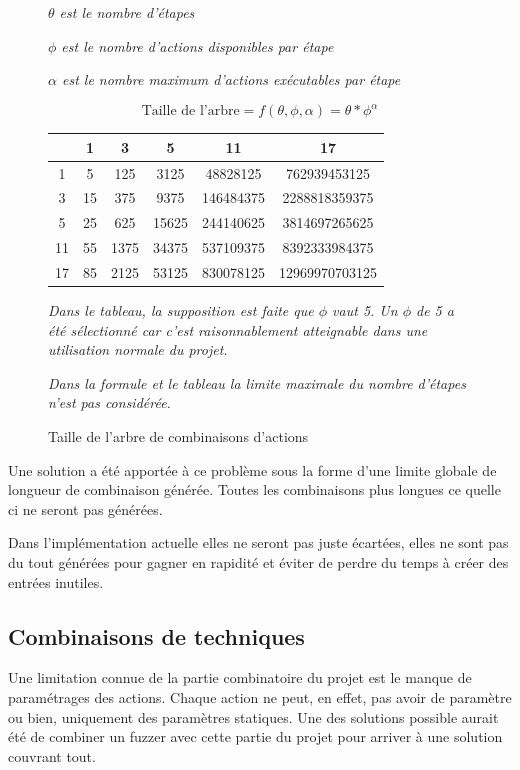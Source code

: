 \documentclass[a4paper]{report}
\begin{document}
\begin{figure}[ht]
	\textit{$ \theta $ est le nombre d'étapes}
	
	\textit{$\phi$ est le nombre d'actions disponibles par étape}
	
	\textit{$\alpha$ est le nombre maximum d'actions exécutables par étape}
	
	$$ \text{Taille de l'arbre} = f(\theta, \phi, \alpha ) = \theta*\phi^{\alpha} $$
	
	\begin{center}
	\begin{tabular}{c||c|c|c|c|c}
	\hbox{\diagbox{$ \theta $}{$\alpha$}}
	 & 1 & 3 & 5 & 11 & 17\\ 
	\hline 
	\hline 
	1 & 5 & 125 & 3125 & 48828125 & 762939453125 \\
	\hline 
	3 & 15 & 375 & 9375 & 146484375 & 2288818359375 \\
	\hline 
	5 & 25 & 625 & 15625 & 244140625 & 3814697265625 \\
	\hline 
	11 & 55 & 1375 & 34375 & 537109375 & 8392333984375 \\
	\hline 
	17 & 85 & 2125 & 53125 & 830078125 & 12969970703125
	\end{tabular}
	\end{center}
	
	\textit{Dans le tableau, la supposition est faite que $ \phi $ vaut 5.
	Un $ \phi $ de 5 a été sélectionné car c'est raisonnablement atteignable dans une utilisation normale du projet.}
	
	\textit{Dans la formule et le tableau la limite maximale du nombre d'étapes n'est pas considérée.}
	\caption{Taille de l'arbre de combinaisons d'actions}
	
	\label{fig:combinaisons_tree}
\end{figure}

Une solution a été apportée à ce problème sous la forme d'une limite globale de longueur de combinaison générée.
Toutes les combinaisons plus longues ce quelle ci ne seront pas générées.

Dans l'implémentation actuelle elles ne seront pas juste écartées, elles ne sont pas du tout générées pour gagner en rapidité et éviter de perdre du temps à créer des entrées inutiles.



\subsection{Combinaisons de techniques}
Une limitation connue de la partie combinatoire du projet est le manque de paramétrages des actions.
Chaque action ne peut, en effet, pas avoir de paramètre ou bien, uniquement des paramètres statiques.
Une des solutions possible aurait été de combiner un fuzzer avec cette partie du projet pour arriver à une solution couvrant tout.
\end{document}
